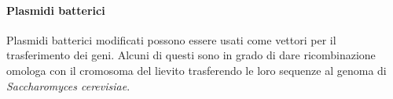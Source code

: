			\paragraph*{Plasmidi batterici}
			Plasmidi batterici modificati possono essere usati come vettori per il trasferimento dei geni.
			Alcuni di questi sono in grado di dare ricombinazione omologa con il cromosoma del lievito trasferendo le loro sequenze al genoma di \emph{Saccharomyces cerevisiae}.
